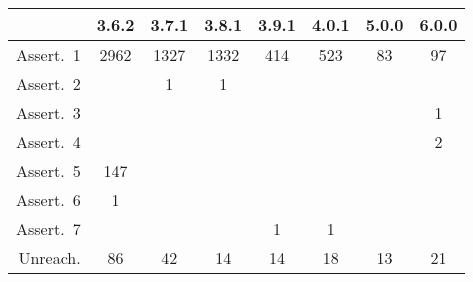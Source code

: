 \begin{tabular}{r|ccccccc}
\toprule
{} & 3.6.2 & 3.7.1 & 3.8.1 & 3.9.1 & 4.0.1 & 5.0.0 & 6.0.0 \\
\midrule
Assert.\ 1 &  2962 &  1327 &  1332 &   414 &   523 &    83 &    97 \\
Assert.\ 2 &       &     1 &     1 &       &       &       &       \\
Assert.\ 3 &       &       &       &       &       &       &     1 \\
Assert.\ 4 &       &       &       &       &       &       &     2 \\
Assert.\ 5 &   147 &       &       &       &       &       &       \\
Assert.\ 6 &     1 &       &       &       &       &       &       \\
Assert.\ 7 &       &       &       &     1 &     1 &       &       \\
Unreach.   &    86 &    42 &    14 &    14 &    18 &    13 &    21 \\
\bottomrule
\end{tabular}
